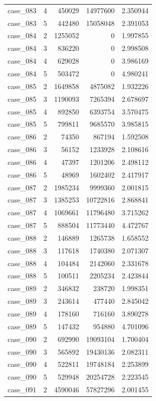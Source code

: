 \begin{longtable}{lrrrr}
case\_083 & 4 & 450029 & 14977600 & 2.350944 \\
case\_083 & 5 & 442480 & 15058048 & 2.391053 \\
case\_084 & 2 & 1255052 & 0 & 1.997855 \\
case\_084 & 3 & 836220 & 0 & 2.998508 \\
case\_084 & 4 & 629028 & 0 & 3.986169 \\
case\_084 & 5 & 503472 & 0 & 4.980241 \\
case\_085 & 2 & 1649858 & 4875082 & 1.932226 \\
case\_085 & 3 & 1190093 & 7265394 & 2.678697 \\
case\_085 & 4 & 892850 & 6393754 & 3.570475 \\
case\_085 & 5 & 799811 & 9685570 & 3.985815 \\
case\_086 & 2 & 74350 & 867194 & 1.592508 \\
case\_086 & 3 & 56152 & 1233928 & 2.108616 \\
case\_086 & 4 & 47397 & 1201206 & 2.498112 \\
case\_086 & 5 & 48969 & 1602402 & 2.417917 \\
case\_087 & 2 & 1985234 & 9999360 & 2.001815 \\
case\_087 & 3 & 1385253 & 10722816 & 2.868841 \\
case\_087 & 4 & 1069661 & 11796480 & 3.715262 \\
case\_087 & 5 & 888504 & 11773440 & 4.472767 \\
case\_088 & 2 & 146889 & 1265738 & 1.658552 \\
case\_088 & 3 & 117618 & 1740380 & 2.071307 \\
case\_088 & 4 & 104484 & 2142060 & 2.331678 \\
case\_088 & 5 & 100511 & 2205234 & 2.423844 \\
case\_089 & 2 & 346832 & 238720 & 1.998351 \\
case\_089 & 3 & 243614 & 477440 & 2.845042 \\
case\_089 & 4 & 178160 & 716160 & 3.890278 \\
case\_089 & 5 & 147432 & 954880 & 4.701096 \\
case\_090 & 2 & 692990 & 19093104 & 1.700404 \\
case\_090 & 3 & 565892 & 19430136 & 2.082311 \\
case\_090 & 4 & 522811 & 19748184 & 2.253899 \\
case\_090 & 5 & 529948 & 20254728 & 2.223545 \\
case\_091 & 2 & 4590046 & 57827296 & 2.001455 \\

\end{longtable}
